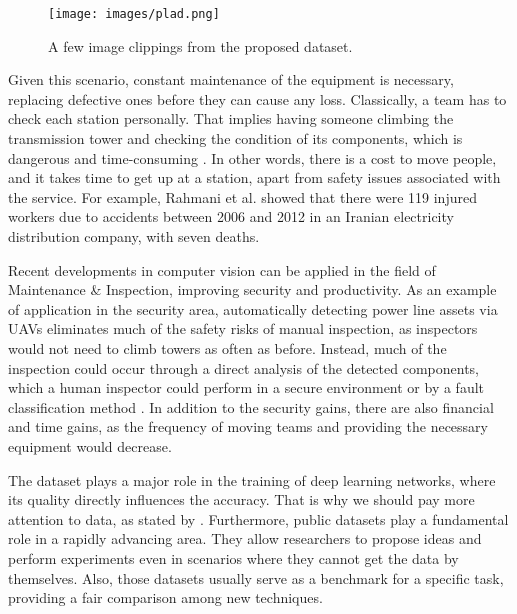 \documentclass[10pt,conference]{IEEEtran}
\begin{document}
\begin{figure}[htp]
    \centering
    \captionsetup{justification=centering}
    \texttt{[image: images/plad.png]}
    \caption{A few image clippings from the proposed dataset.}
    \label{fig:dataset}
\end{figure}

Given this scenario, constant maintenance of the equipment is necessary, replacing defective ones before they can cause any loss. Classically, a team has to check each station personally. That implies having someone climbing the transmission tower and checking the condition of its components, which is dangerous and time-consuming \cite{hu2017inspection}. In other words, there is a cost to move people, and it takes time to get up at a station, apart from safety issues associated with the service. For example, Rahmani et al. \cite{rahmani2013descriptive} showed that there were 119 injured workers due to accidents between 2006 and 2012 in an Iranian electricity distribution company, with seven deaths.

Recent developments in computer vision can be applied in the field of Maintenance \& Inspection, improving security and productivity. As an example of application in the security area, automatically detecting power line assets via UAVs eliminates much of the safety risks of manual inspection, as inspectors would not need to climb towers as often as before. Instead, much of the inspection could occur through a direct analysis of the detected components, which a human inspector could perform in a secure environment or by a fault classification method \cite{li2021fault}. In addition to the security gains, there are also financial and time gains, as the frequency of moving teams and providing the necessary equipment would decrease. 







The dataset plays a major role in the training of deep learning networks, where its quality directly influences the accuracy. That is why we should pay more attention to data, as stated by \cite{sambasivan2021everyone}. Furthermore, public datasets play a fundamental role in a rapidly advancing area. They allow researchers to propose ideas and perform experiments even in scenarios where they cannot get the data by themselves. Also, those datasets usually serve as a benchmark for a specific task, providing a fair comparison among new techniques. 
\end{document}
